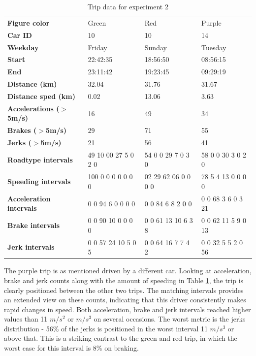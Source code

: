 \begin{table}
    \centering
    \begin{tabular}{>{\bfseries}l|lll|}
    Figure color            & Green                & Red                 & Purple             \\
    Car ID                  & 10                   & 10                  & 14                 \\
    Weekday                 & Friday               & Sunday              & Tuesday            \\
    Start                   & 22:42:35             & 18:56:50            & 08:56:15           \\
    End                     & 23:11:42             & 19:23:45            & 09:29:19           \\
    Distance (km)           & 32.04                & 31.76               & 31.67              \\
    Distance sped (km)      & 0.02                 & 13.06               & 3.63               \\
    Accelerations ($>$5m/s) & 16                   & 49                  & 34                 \\
    Brakes ($>$5m/s)        & 29                   & 71                  & 55                 \\
    Jerks ($>$5m/s)         & 21                   & 56                  & 41                 \\
    Roadtype intervals      & 49 10 00 27 5  0 2 0 & 54 0 0 29 7 0 3 0   & 58 0 0 30 3 0 2 0  \\
    Speeding intervals      & 100 0 0 0 0 0 0 0    & 02 29 62 06 0 0 0 0 & 78 5 4 13 0 0 0 0  \\
    Acceleration intervals  & 0 0 94 6 0 0 0 0     & 0 0 84 6 8 2 0 0    & 0 0 68 3 6 0 3 21  \\
    Brake intervals         & 0 0 90 10 0 0 0 0    & 0 0 61 13 10 6 3 8  & 0 0 62 11 5 9 0 13 \\
    Jerk intervals          & 0 0 57 24 10 5 0 5   & 0 0 64 16 7 7 4 2   & 0 0 32 5 5 2 0 56  \\
    \end{tabular}
    \caption{Trip data for experiment 2}
    \label{tab:longtrips}
\end{table}

The purple trip is as mentioned driven by a different car. Looking at acceleration, brake and jerk counts along with the amount of speeding in Table \ref{tab:longtrips}, the trip is clearly positioned between the other two trips. The matching intervals provides an extended view on these counts, indicating that this driver consistently makes rapid changes in speed. Both acceleration, brake and jerk intervals reached higher values than 11 $m/s^2$ or $m/s^3$ on several occasions. The worst metric is the jerks distribution - 56\% of the jerks is positioned in the worst interval 11 $m/s^3$ or above that. This is a striking contrast to the green and red trip, in which the worst case for this interval is 8\% on braking.

